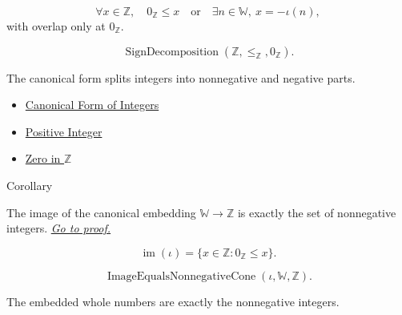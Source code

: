 \begin{remark*}
\[
\forall x\in\mathbb{Z},\quad
0_{\mathbb{Z}}\le x
\quad\text{or}\quad
\exists n\in\mathbb{W},\ x=-\iota(n),
\]
with overlap only at $0_{\mathbb{Z}}$.
\end{remark*}

\begin{remark*}
\[
\operatorname{SignDecomposition}(\mathbb{Z},\le_{\mathbb{Z}},0_{\mathbb{Z}}).
\]
\end{remark*}

\begin{remark*}[Interpretation]
The canonical form splits integers into nonnegative and negative parts.
\end{remark*}

\begin{dependencies}
\begin{itemize}
  \item \hyperref[thm:canonical-form-of-integers]{Canonical Form of Integers}
  \item \hyperref[def:positive-integer]{Positive Integer}
  \item \hyperref[def:zero-in-z]{Zero in $\mathbb{Z}$}
\end{itemize}
\end{dependencies}

\begin{corollarybox}{Corollary}
\begin{corollary}
\label{cor:image-of-embedding-is-nonnegatives}
The image of the canonical embedding $\mathbb{W}\to\mathbb{Z}$ is exactly
the set of nonnegative integers.
\hyperref[prf:image-of-embedding-is-nonnegatives]{\textit{Go to proof.}}
\end{corollary}
\end{corollarybox}

\begin{remark*}
\[
\operatorname{im}(\iota)
=
\{x\in\mathbb{Z}:0_{\mathbb{Z}}\le x\}.
\]
\end{remark*}

\begin{remark*}
\[
\operatorname{ImageEqualsNonnegativeCone}(\iota,\mathbb{W},\mathbb{Z}).
\]
\end{remark*}

\begin{remark*}[Interpretation]
The embedded whole numbers are exactly the nonnegative integers.
\end{remark*}

